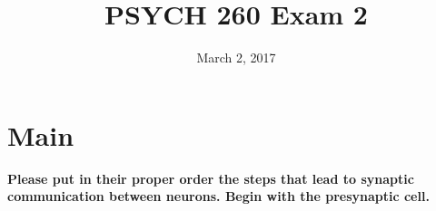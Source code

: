 \documentclass[answers]{exam}
\title{PSYCH 260 Exam 2}
\author{}
\date{March 2, 2017}
\begin{document}
\maketitle

\begin{center}
\end{center}
\vspace{0.1in}

\newpage

\section{Main}

\textbf{Please put in their proper order the steps that lead to synaptic communication between neurons. Begin with the presynaptic cell.}
\end{document}
